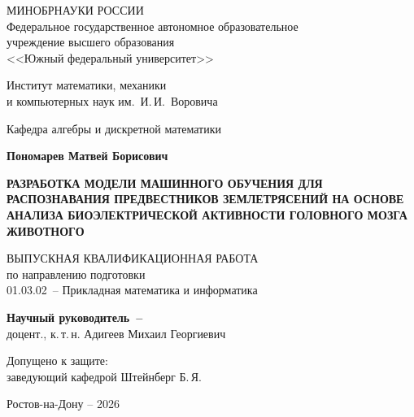 


\thispagestyle{empty}
\begin{singlespacing}
\begin{center}

МИНОБРНАУКИ РОССИИ\\ [12pt]
Федеральное государственное автономное образовательное\\
учреждение высшего образования\\
<<Южный федеральный университет>>

\vspace{\baselineskip}
Институт математики, механики\\
и компьютерных наук им.~И.\,И.~Воровича

\vspace{\baselineskip}
Кафедра алгебры и дискретной математики

\vfill
\textbf{Пономарев Матвей Борисович}

\vspace{\baselineskip}
{\bf РАЗРАБОТКА МОДЕЛИ МАШИННОГО ОБУЧЕНИЯ 
ДЛЯ РАСПОЗНАВАНИЯ ПРЕДВЕСТНИКОВ 
ЗЕМЛЕТРЯСЕНИЙ НА ОСНОВЕ АНАЛИЗА 
БИОЭЛЕКТРИЧЕСКОЙ АКТИВНОСТИ 
ГОЛОВНОГО МОЗГА ЖИВОТНОГО }

\vspace{15mm}
ВЫПУСКНАЯ КВАЛИФИКАЦИОННАЯ РАБОТА\\
по направлению подготовки\\
01.03.02~-- Прикладная математика и информатика


\vspace{10mm}
\textbf{Научный руководитель~--}\\
доцент., к.\,т.\,н. Адигеев Михаил Георгиевич

\vspace{15mm}

\noindent
\begin{flushleft}
Допущено к защите:\\
заведующий кафедрой \underline{\hspace*{65mm}} Штейнберг Б.\,Я.
\end{flushleft}




\vfill
Ростов-на-Дону -- 2026

\end{center}

\singlespacing
\end{singlespacing} 